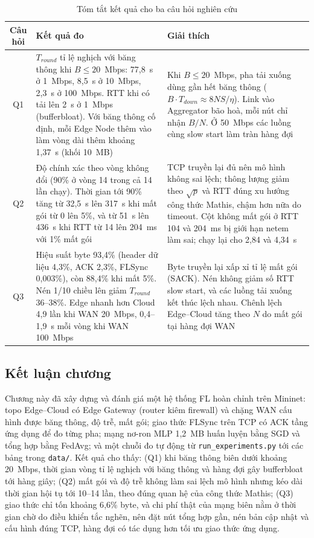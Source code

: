 \begin{table}[H]
    \centering
    \caption{Tóm tắt kết quả cho ba câu hỏi nghiên cứu}
    \label{tab:summary}
    \begin{tabularx}{\textwidth}{c >{\raggedright\arraybackslash}X >{\raggedright\arraybackslash}X}
        \toprule
        \textbf{Câu hỏi} & \textbf{Kết quả đo} & \textbf{Giải thích} \\
        \midrule
        Q1 & $T_{round}$ tỉ lệ nghịch với băng thông khi $B \le 20$~Mbps: 77{,}8~s ở 1~Mbps, 8{,}5~s ở 10~Mbps, 2{,}3~s ở 100~Mbps. RTT khi có tải lên 2~s ở 1~Mbps (bufferbloat). Với băng thông cố định, mỗi Edge Node thêm vào làm vòng dài thêm khoảng 1{,}37~s (khối 10~MB) & Khi $B \le 20$~Mbps, pha tải xuống dùng gần hết băng thông ($B \cdot T_{down} \approx 8NS/\eta$). Link vào Aggregator bão hoà, mỗi nút chỉ nhận $B/N$. Ở 50~Mbps các luồng cùng slow start làm tràn hàng đợi \\
        \midrule
        Q2 & Độ chính xác theo vòng không đổi (90\% ở vòng 14 trong cả 14 lần chạy). Thời gian tới 90\% tăng từ 32{,}5~s lên 317~s khi mất gói từ 0 lên 5\%, và từ 51~s lên 436~s khi RTT từ 14 lên 204~ms với 1\% mất gói & TCP truyền lại đủ nên mô hình không sai lệch; thông lượng giảm theo $\sqrt{p}$ và RTT đúng xu hướng công thức Mathis, chậm hơn nữa do timeout. Cột không mất gói ở RTT 104 và 204~ms bị giới hạn netem làm sai; chạy lại cho 2{,}84 và 4{,}34~s \\
        \midrule
        Q3 & Hiệu suất byte 93{,}4\% (header dữ liệu 4{,}3\%, ACK 2{,}3\%, FLSync 0{,}003\%), còn 88{,}4\% khi mất 5\%. Nén 1/10 chiều lên giảm $T_{round}$ 36--38\%. Edge nhanh hơn Cloud 4{,}9 lần khi WAN 20~Mbps, 0{,}4--1{,}9~s mỗi vòng khi WAN 100~Mbps & Byte truyền lại xấp xỉ tỉ lệ mất gói (SACK). Nén không giảm số RTT slow start, và các luồng tải xuống kết thúc lệch nhau. Chênh lệch Edge--Cloud tăng theo $N$ do mất gói tại hàng đợi WAN \\
        \bottomrule
    \end{tabularx}
\end{table}

\subsection{Kết luận chương}
Chương này đã xây dựng và đánh giá một hệ thống FL hoàn chỉnh trên Mininet: topo Edge--Cloud có Edge Gateway (router kiêm firewall) và chặng WAN cấu hình được băng thông, độ trễ, mất gói; giao thức FLSync trên TCP có ACK tầng ứng dụng để đo từng pha; mạng nơ-ron MLP 1{,}2~MB huấn luyện bằng SGD và tổng hợp bằng FedAvg; và một chuỗi đo tự động từ \texttt{run\_experiments.py} tới các bảng trong \texttt{data/}. Kết quả cho thấy: (Q1) khi băng thông biên dưới khoảng 20~Mbps, thời gian vòng tỉ lệ nghịch với băng thông và hàng đợi gây bufferbloat tới hàng giây; (Q2) mất gói và độ trễ không làm sai lệch mô hình nhưng kéo dài thời gian hội tụ tới 10--14 lần, theo đúng quan hệ của công thức Mathis; (Q3) giao thức chỉ tốn khoảng 6{,}6\% byte, và chi phí thật của mạng biên nằm ở thời gian chờ do điều khiển tắc nghẽn, nên đặt nút tổng hợp gần, nén bản cập nhật và cấu hình đúng TCP, hàng đợi có tác dụng hơn tối ưu giao thức ứng dụng.

\cleardoublepage
